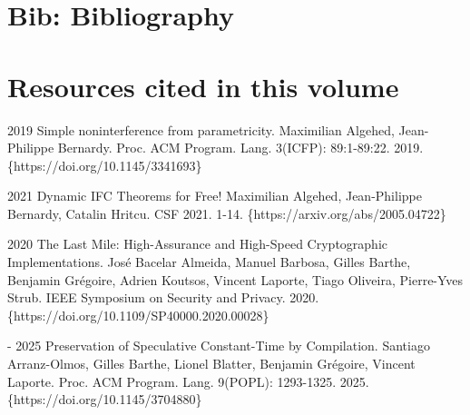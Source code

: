 \documentclass[12pt]{report}
\begin{document}

\begin{coqdoccode}
\end{coqdoccode}
\section{Bib: Bibliography}


\begin{coqdoccode}
\coqdocemptyline
\end{coqdoccode}
\section{Resources cited in this volume}





   2019 Simple noninterference from
  parametricity. Maximilian Algehed, Jean-Philippe Bernardy. Proc. ACM
  Program. Lang. 3(ICFP): 89:1-89:22. 2019. \{https://doi.org/10.1145/3341693\}


   2021 Dynamic IFC Theorems for Free! Maximilian Algehed,
  Jean-Philippe Bernardy, Catalin Hritcu. CSF 2021. 1-14.
  \{https://arxiv.org/abs/2005.04722\}


   2020 The Last Mile: High-Assurance and High-Speed
  Cryptographic Implementations. José Bacelar Almeida, Manuel Barbosa, Gilles
  Barthe, Benjamin Grégoire, Adrien Koutsos, Vincent Laporte, Tiago Oliveira,
  Pierre-Yves Strub. IEEE Symposium on Security and Privacy. 2020.
  \{https://doi.org/10.1109/SP40000.2020.00028\}


-   2025 Preservation of Speculative Constant-Time by
  Compilation. Santiago Arranz-Olmos, Gilles Barthe, Lionel Blatter, Benjamin
  Grégoire, Vincent Laporte. Proc. ACM Program. Lang. 9(POPL):
  1293-1325. 2025. \{https://doi.org/10.1145/3704880\}
\end{document}
